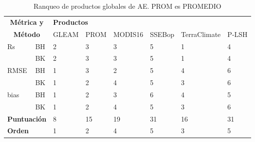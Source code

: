 \begin{table}[hbt]
\caption{Ranqueo de productos globales de AE. PROM es PROMEDIO}
\label{tab:Table_rank}
\begin{tabular}{llllllll}
\hline
\multicolumn{2}{c}{\textbf{Métrica y}}  & \multicolumn{6}{l}{\textbf{Productos}}                 \\
\multicolumn{2}{c}{\textbf{Método}}     & GLEAM & PROM & MODIS16 & SSEBop & TerraClimate & P-LSH \\ \hline
Rs                   & BH               & 2     & 3    & 3       & 5      & 1            & 4     \\
                     & BK               & 2     & 3    & 3       & 5      & 1            & 4     \\
RMSE                 & BH               & 1     & 3    & 2       & 5      & 4            & 6     \\
                     & BK               & 1     & 2    & 4       & 5      & 3            & 6     \\
bias                 & BH               & 1     & 2    & 3       & 6      & 4            & 5     \\
                     & BK               & 1     & 2    & 4       & 5      & 3            & 6     \\ \hline
\multicolumn{2}{l}{\textbf{Puntuación}} & 8     & 15   & 19      & 31     & 16           & 31    \\ \hline
\multicolumn{2}{l}{\textbf{Orden}}      & 1     & 2    & 4       & 5      & 3            & 5     \\ \hline
\end{tabular}
\end{table}